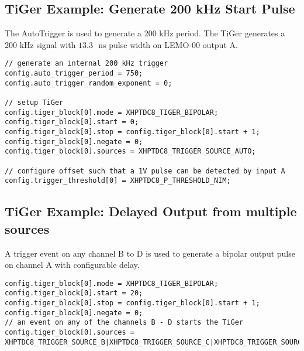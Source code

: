 \newpage
\subsection{TiGer Example: Generate 200 kHz Start Pulse}
The AutoTrigger is used to generate a 200 kHz period. 
The TiGer generates a 200 kHz signal with $13.3$\,~ns pulse width on LEMO-00
output A.

\begin{lstlisting}
// generate an internal 200 kHz trigger
config.auto_trigger_period = 750;
config.auto_trigger_random_exponent = 0;

// setup TiGer 
config.tiger_block[0].mode = XHPTDC8_TIGER_BIPOLAR;
config.tiger_block[0].start = 0;
config.tiger_block[0].stop = config.tiger_block[0].start + 1;
config.tiger_block[0].negate = 0;
config.tiger_block[0].sources = XHPTDC8_TRIGGER_SOURCE_AUTO;

// configure offset such that a 1V pulse can be detected by input A 
config.trigger_threshold[0] = XHPTDC8_P_THRESHOLD_NIM;
\end{lstlisting}

\subsection{TiGer Example: Delayed Output from multiple sources}
A trigger event on any channel B to D is used to generate a bipolar output
pulse on channel A with configurable delay. 
\begin{lstlisting}
config.tiger_block[0].mode = XHPTDC8_TIGER_BIPOLAR;
config.tiger_block[0].start = 20;
config.tiger_block[0].stop = config.tiger_block[0].start + 1;
config.tiger_block[0].negate = 0;
// an event on any of the channels B - D starts the TiGer 
config.tiger_block[0].sources = XHPTDC8_TRIGGER_SOURCE_B|XHPTDC8_TRIGGER_SOURCE_C|XHPTDC8_TRIGGER_SOURCE_D;
\end{lstlisting}
